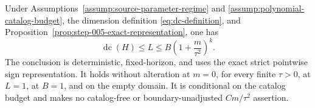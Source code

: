 \begin{proposition}
\label{prop:step-006-dimension-chain}
Under Assumptions~\ref{assump:source-parameter-regime} and
\ref{assump:polynomial-catalog-budget}, the dimension definition
\eqref{eq:dc-definition}, and
Proposition~\ref{prop:step-005-exact-representation}, one has
\begin{equation}\label{eq:dimension-chain}
\operatorname{dc}(H)
\le L
\le B\left(1+\frac{m}{\tau^2}\right)^k.
\end{equation}
The conclusion is deterministic, fixed-horizon, and uses the exact strict
pointwise sign representation.  It holds without alteration at $m=0$, for
every finite $\tau>0$, at $L=1$, at $B=1$, and on the empty domain.  It is
conditional on the catalog budget and makes no catalog-free or
boundary-unadjusted $Cm/\tau^2$ assertion.
\end{proposition}

